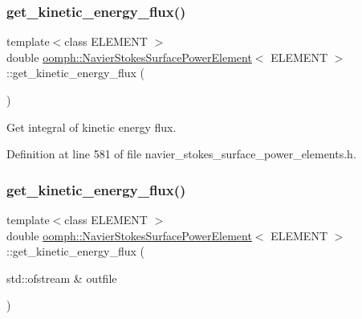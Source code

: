 \subsubsection{\texorpdfstring{get\+\_\+kinetic\+\_\+energy\+\_\+flux()}{get\_kinetic\_energy\_flux()}\hspace{0.1cm}{\footnotesize\ttfamily [1/2]}}
{\footnotesize\ttfamily template$<$class E\+L\+E\+M\+E\+NT $>$ \\
double \hyperlink{classoomph_1_1NavierStokesSurfacePowerElement}{oomph\+::\+Navier\+Stokes\+Surface\+Power\+Element}$<$ E\+L\+E\+M\+E\+NT $>$\+::get\+\_\+kinetic\+\_\+energy\+\_\+flux (\begin{DoxyParamCaption}{ }\end{DoxyParamCaption})\hspace{0.3cm}{\ttfamily [inline]}}



Get integral of kinetic energy flux. 



Definition at line 581 of file navier\+\_\+stokes\+\_\+surface\+\_\+power\+\_\+elements.\+h.

\mbox{\label{classoomph_1_1NavierStokesSurfacePowerElement_a1d2f901cf1ce20919aad222a013210b4}} 
\subsubsection{\texorpdfstring{get\+\_\+kinetic\+\_\+energy\+\_\+flux()}{get\_kinetic\_energy\_flux()}\hspace{0.1cm}{\footnotesize\ttfamily [2/2]}}
{\footnotesize\ttfamily template$<$class E\+L\+E\+M\+E\+NT $>$ \\
double \hyperlink{classoomph_1_1NavierStokesSurfacePowerElement}{oomph\+::\+Navier\+Stokes\+Surface\+Power\+Element}$<$ E\+L\+E\+M\+E\+NT $>$\+::get\+\_\+kinetic\+\_\+energy\+\_\+flux (\begin{DoxyParamCaption}\item[{std\+::ofstream \&}]{outfile }\end{DoxyParamCaption})\hspace{0.3cm}{\ttfamily [inline]}}



